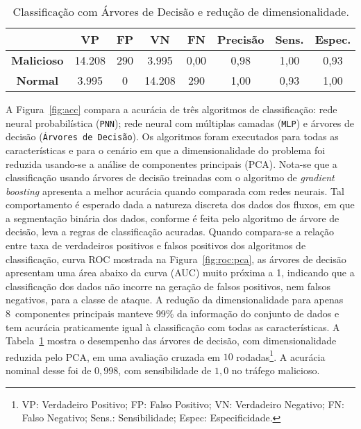 \documentclass[12pt]{article}
\begin{document}
\begin{table}[h!]
\vspace{-3mm}
\centering
\caption{Classificação com Árvores de Decisão e redução de dimensionalidade.}
\label{tab:nn}
\begin{tabular}{|c|c|c|c|c|c|c|c|}
\hline
& \textbf{VP} & \textbf{FP} & \textbf{VN} & \textbf{FN} & \textbf{Precisão} & \textbf{Sens.} & \textbf{Espec.}\\ \hline
\textbf{Malicioso}& 14.208 & 290 & 3.995 & 0,00 & 0,98 & 1,00 & 0,93  \\ \hline
\textbf{Normal}& 3.995 & 0 & 14.208 & 290 & 1,00 & 0,93 & 1,00 \\ \hline
\end{tabular}
\end{table}

A Figura~\ref{fig:acc} compara a acurácia de três algoritmos de classificação: rede neural probabilística (\texttt{PNN}); rede neural com múltiplas camadas (\texttt{MLP}) e árvores de decisão (\texttt{Árvores de Decisão}). Os algoritmos foram executados para todas as características e para o cenário em que a dimensionalidade do problema foi reduzida usando-se a análise de componentes principais (PCA). Nota-se que a classificação usando árvores de decisão treinadas com o algoritmo de {\it gradient boosting} apresenta a melhor acurácia quando comparada com redes neurais. Tal comportamento é esperado dada a natureza discreta dos dados dos fluxos, em que a segmentação binária dos dados, conforme é feita pelo algoritmo de árvore de decisão, leva a regras de classificação acuradas. Quando compara-se a relação entre taxa de verdadeiros positivos e falsos positivos dos algoritmos de classificação, curva ROC mostrada na Figura~\ref{fig:roc:pca}, as árvores de decisão apresentam uma área abaixo da curva (AUC) muito próxima a 1, indicando que a classificação dos dados não incorre na geração de falsos positivos, nem falsos negativos, para a classe de ataque. A redução da dimensionalidade para apenas 8~componentes principais manteve 99\% da informação do conjunto de dados e tem acurácia praticamente igual à classificação com todas as características.
A Tabela~\ref{tab:nn} mostra o desempenho das árvores de decisão, com dimensionalidade reduzida pelo PCA, em uma avaliação cruzada em $10$ rodadas\footnote{VP: Verdadeiro Positivo; FP: Falso Positivo; VN: Verdadeiro Negativo; FN: Falso Negativo; Sens.: Sensibilidade; Espec: Especificidade.}. A acurácia nominal desse foi de $0,998$, com sensibilidade de $1,0$ no tráfego malicioso.
\end{document}
